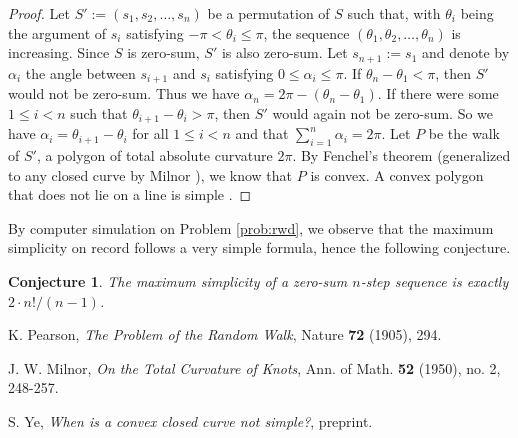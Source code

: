 \documentclass{amsart}
\newtheorem{conjecture}[proposition]{Conjecture}
\theoremstyle{definition}
\theoremstyle{problem}
\theoremstyle{remark}
\begin{document}
\begin{proof}
    Let $S':=(s_1,s_2,\dots,s_n)$ be a permutation of $S$ such that, with
    $\theta_i$ being the argument of $s_i$ satisfying $-\pi<\theta_i\le\pi$,
    the sequence $(\theta_1,\theta_2,\dots,\theta_n)$ is increasing.
    Since $S$ is zero-sum, $S'$ is also zero-sum.
    Let $s_{n+1}:=s_1$ and denote by $\alpha_i$ the angle between
    $s_{i+1}$ and $s_i$ satisfying $0\le\alpha_i\le\pi$.
    If $\theta_n-\theta_1<\pi$, then $S'$ would not be zero-sum.
    Thus we have $\alpha_n=2\pi-(\theta_n-\theta_1)$.
    If there were some $1\le i<n$ such that $\theta_{i+1}-\theta_{i}>\pi$,
    then $S'$ would again not be zero-sum. So we have $\alpha_i=\theta_{i+1}-\theta_i$
    for all $1\le i<n$ and that $\sum_{i=1}^n\alpha_i=2\pi$.
    Let $P$ be the walk of $S'$, a polygon of total absolute curvature $2\pi$.
    By Fenchel's theorem (generalized to any closed curve by Milnor
    \cite[Theorem 3.4]{milnor}), we know that $P$ is convex.
    A convex polygon that does not lie on a line is simple \cite{ye}.
\end{proof}

By computer simulation on Problem \ref{prob:rwd}, we observe that the maximum
simplicity on record follows a very simple formula, hence the following conjecture.

\begin{conjecture}
    \label{conj:value_formula}
    The maximum simplicity of a zero-sum $n$-step sequence
    is exactly $2\cdot n!/(n-1)$.
\end{conjecture}

\begin{thebibliography}{9}

    K. Pearson,
    \emph{The Problem of the Random Walk},
    Nature \textbf{72} (1905), 294.

    J. W. Milnor,
    \emph{On the Total Curvature of Knots},
    Ann. of Math.
    \textbf{52} (1950), no. 2, 248-257.

    S. Ye,
    \emph{When is a convex closed curve not simple?},
    preprint.

\end{thebibliography}
\end{document}
